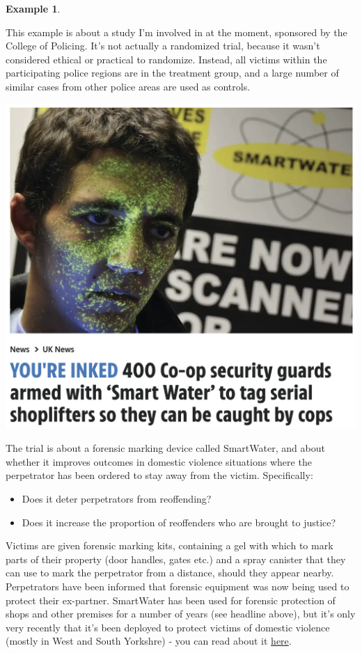 \documentclass[
  openany]{book}
\providecommand{\tightlist}{%
  \setlength{\itemsep}{0pt}\setlength{\parskip}{0pt}}
\theoremstyle{definition}
\theoremstyle{definition}
\newtheorem{example}{Example}[chapter]
\theoremstyle{definition}
\theoremstyle{definition}
\theoremstyle{remark}
\begin{document}
\begin{example}
\protect\hypertarget{exm:cop}{}\label{exm:cop}

This example is about a study I'm involved in at the moment, sponsored by the College of Policing. It's not actually a randomized trial, because it wasn't considered ethical or practical to randomize. Instead, all victims within the participating police regions are in the treatment group, and a large number of similar cases from other police areas are used as controls.

\includegraphics[width=17.64in]{images/smartwater}

The trial is about a forensic marking device called SmartWater, and about whether it improves outcomes in domestic violence situations where the perpetrator has been ordered to stay away from the victim. Specifically:

\begin{itemize}
\tightlist
\item
  Does it deter perpetrators from reoffending?
\item
  Does it increase the proportion of reoffenders who are brought to justice?
\end{itemize}

Victims are given forensic marking kits, containing a gel with which to mark parts of their property (door handles, gates etc.) and a spray canister that they can use to mark the perpetrator from a distance, should they appear nearby. Perpetrators have been informed that forensic equipment was now being used to protect their ex-partner. SmartWater has been used for forensic protection of shops and other premises for a number of years (see headline above), but it's only very recently that it's been deployed to protect victims of domestic violence (mostly in West and South Yorkshre) - you can read about it \href{https://www.bbc.co.uk/news/technology-60414452}{here}.


\end{example}
\end{document}

